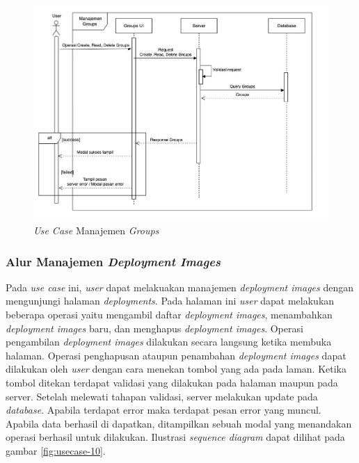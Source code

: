 \begin{figure}[ht]
  \centering
  \includegraphics[width=1\textwidth]{resources/chapter-3/usecase/uc-09.jpg}
  \caption{\textit{Use Case} Manajemen \textit{Groups}}
  \label{fig:usecase-09}
\end{figure}

\pagebreak

\subsubsection{Alur Manajemen \textit{Deployment Images}}

Pada \textit{use case} ini, \textit{user} dapat melakuakan manajemen \textit{deployment images} dengan mengunjungi halaman \textit{deployments}. Pada halaman ini \textit{user} dapat melakukan beberapa operasi yaitu mengambil daftar \textit{deployment images}, menambahkan \textit{deployment images} baru, dan menghapus \textit{deployment images}. Operasi pengambilan \textit{deployment images} dilakukan secara langsung ketika membuka halaman. Operasi penghapusan ataupun penambahan \textit{deployment images} dapat dilakukan oleh \textit{user} dengan cara menekan tombol yang ada pada laman. Ketika tombol ditekan terdapat validasi yang dilakukan pada halaman maupun pada server. Setelah melewati tahapan validasi, server melakukan update pada \textit{database}. Apabila terdapat error maka terdapat pesan error yang muncul. Apabila data berhasil di dapatkan, ditampilkan sebuah modal yang menandakan operasi berhasil untuk dilakukan. Ilustrasi \textit{sequence diagram} dapat dilihat pada gambar \ref{fig:usecase-10}.

